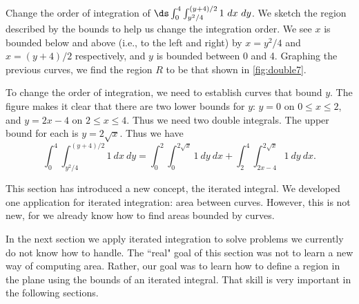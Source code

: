 \begin{example}\label{ex_double7}
Change the order of integration of $\ds\int_0^4\int_{y^2/4}^{(y+4)/2}1\ dx\ dy$.
\solution
We sketch the region described by the bounds to help us change the integration order. We see $x$ is bounded below and above (i.e., to the left and right) by $x=y^2/4$ and $x=(y+4)/2$ respectively, and $y$ is bounded between 0 and 4. Graphing the previous curves, we find the region $R$ to be that shown in \autoref{fig:double7}.


To change the order of integration, we need to establish curves that bound $y$. The figure makes it clear that there are two lower bounds for $y$: $y=0$ on $0\leq x\leq 2$, and $y=2x-4$ on $2\leq x\leq 4$. Thus we need two double integrals. The upper bound for each is $y=2\sqrt{x}$. Thus we have
\[
\int_0^4\int_{y^2/4}^{(y+4)/2}1\ dx\ dy
= \int_0^2\int_0^{2\sqrt{x}} 1\ dy\ dx + \int_2^4\int_{2x-4}^{2\sqrt{x}}1\ dy\ dx.
\]
\end{example}

This section has introduced a new concept, the iterated integral. We developed one application for iterated integration: area between curves. However, this is not new, for we already know how to find areas bounded by curves.

In the next section we apply iterated integration to solve problems we currently do not know how to handle. The ``real" goal of this section was not to learn a new way of computing area. Rather, our goal was to learn how to define a region in the plane using the bounds of an iterated integral. That skill is very important in the following sections.

